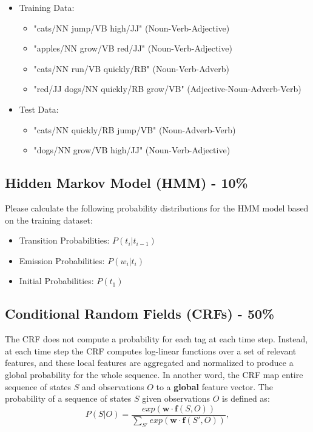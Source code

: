 \documentclass{article}
\begin{document}
\begin{itemize}
    \item Training Data:
    \begin{itemize}
        \item "cats/NN jump/VB high/JJ" (Noun-Verb-Adjective)
        \item "apples/NN grow/VB red/JJ" (Noun-Verb-Adjective)
        \item "cats/NN run/VB quickly/RB" (Noun-Verb-Adverb)
        \item "red/JJ dogs/NN quickly/RB grow/VB" (Adjective-Noun-Adverb-Verb)
    \end{itemize}
    
    \item Test Data:
    \begin{itemize}
        \item "cats/NN quickly/RB jump/VB" (Noun-Adverb-Verb)
        \item "dogs/NN grow/VB high/JJ" (Noun-Verb-Adjective)
    \end{itemize}
\end{itemize}

\subsection*{Hidden Markov Model (HMM) - 10\%}

Please calculate the following probability distributions for the HMM model
based on the training dataset:

\begin{itemize}
    \item Transition Probabilities: $P(t_{i}|t_{i-1})$
    \item Emission Probabilities: $P(w_{i}|t_{i})$
    \item Initial Probabilities: $P(t_{1})$
\end{itemize}


\subsection*{Conditional Random Fields (CRFs) - 50\%}

The CRF does not compute a probability for each tag at each time step. 
Instead, at each time step the CRF computes log-linear functions over 
a set of relevant features, and these local features are aggregated and 
normalized to produce a global probability for the whole sequence.
In another word, the CRF map entire sequence of states $S$ and
observations $O$ to a \textbf{global} feature vector.
The probability of a sequence of states $S$ given observations $O$ is defined as:
$$P(S|O) = \frac{exp(\mathbf{w}\cdot \mathbf{f}(S, O) )}{ {\textstyle \sum_{S'}^{}exp(\mathbf{w}\cdot \mathbf{f}(S', O) )} },$$
\end{document}
